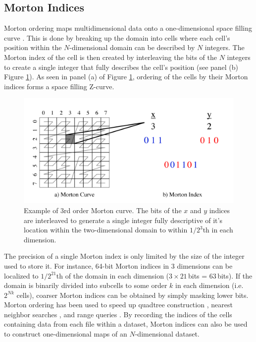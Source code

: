 \documentclass[apjl]{emulateapj}
\begin{document}
\subsection{Morton Indices}
Morton ordering maps multidimensional data onto a one-dimensional space filling curve \citep{Morton1996}. This is done by breaking up the domain into cells where each cell's position within the $N$-dimensional domain can be described by $N$ integers. The Morton index of the cell is then created by interleaving the bits of the $N$ integers to create a single integer that fully describes the cell's position (see panel (b) Figure \ref{fig:zorder}). As seen in panel (a) of Figure \ref{fig:zorder}, ordering of the cells by their Morton indices forms a space filling Z-curve.
%
\begin{figure}[htbp]
\begin{center}
\includegraphics[width=\columnwidth,keepaspectratio]{../images/zorder.png}
\caption{Example of 3rd order Morton curve. The bits of the $x$ and $y$ indices are interleaved to generate a single integer fully descriptive of it's location within the two-dimensional domain to within $1/2^{3}$th in each dimension.}
\label{fig:zorder}
\end{center}
\end{figure}
%

The precision of a single Morton index is only limited by the size of the integer used to store it. For instance, 64-bit Morton indices in 3 dimensions can be localized to $1/2^{21}$th of the domain in each dimension ($3\times21$\,bits = 63\,bits). If the domain is binarily divided into subcells to some order $k$ in each dimension (i.e. $2^{Nk}$ cells), coarser Morton indices can be obtained by simply masking lower bits. Morton ordering has been used to speed up quadtree construction \citep{Hjaltason2002}, nearest neighbor searches \citep{Connor2010}, and range queries \citep{Orenstein1984}. By recording the indices of the cells containing data from each file within a dataset, Morton indices can also be used to construct one-dimensional maps of an $N$-dimensional dataset.
\end{document}
